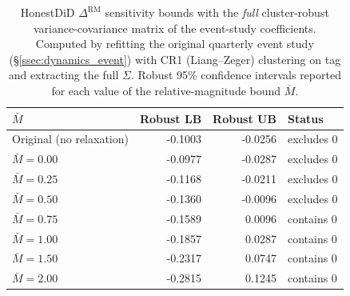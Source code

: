 \begin{table}[ht]
\centering
\caption{HonestDiD $\Delta^{\text{RM}}$ sensitivity bounds with the \emph{full} cluster-robust variance-covariance matrix of the event-study coefficients. Computed by refitting the original quarterly event study (\S\ref{ssec:dynamics_event}) with CR1 (Liang--Zeger) clustering on tag and extracting the full $\Sigma$. Robust 95\% confidence intervals reported for each value of the relative-magnitude bound $\bar M$.}
\label{tab:honestdid_fullvcv}
\small \setlength{\tabcolsep}{6pt}
\begin{tabular}{lrrl}
\toprule
$\bar M$ & Robust LB & Robust UB & Status \\
\midrule
Original (no relaxation) & -0.1003 & -0.0256 & excludes 0 \\
$\bar M = 0.00$ & -0.0977 & -0.0287 & excludes 0 \\
$\bar M = 0.25$ & -0.1168 & -0.0211 & excludes 0 \\
$\bar M = 0.50$ & -0.1360 & -0.0096 & excludes 0 \\
$\bar M = 0.75$ & -0.1589 & 0.0096 & contains 0 \\
$\bar M = 1.00$ & -0.1857 & 0.0287 & contains 0 \\
$\bar M = 1.50$ & -0.2317 & 0.0747 & contains 0 \\
$\bar M = 2.00$ & -0.2815 & 0.1245 & contains 0 \\
\bottomrule
\end{tabular}
\end{table}